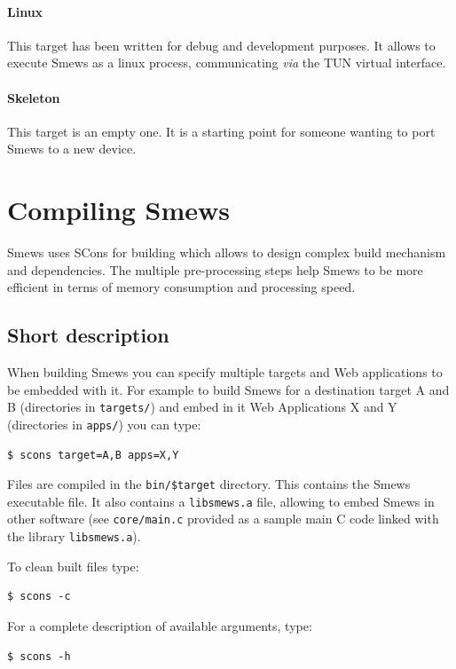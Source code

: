 \documentclass{report}
\begin{document}
\paragraph{Linux}

This target has been written for debug and development purposes. It allows to execute Smews as a linux process, communicating {\it via} the TUN virtual interface.

\paragraph{Skeleton}

This target is an empty one. It is a starting point for someone wanting to port Smews to a new device.

\section{Compiling Smews}
\label{sec:compile}

Smews uses SCons for building which allows to design complex build mechanism and dependencies. The multiple pre-processing steps help Smews to be more efficient in terms of memory consumption and processing speed.

\subsection{Short description}

When building Smews you can specify multiple targets and Web applications to be embedded with it. For example to build Smews for a destination target A and B (directories in \verb+targets/+) and embed in it Web Applications X and Y (directories in \verb+apps/+) you can type:

\begin{verbatim}
$ scons target=A,B apps=X,Y
\end{verbatim}

Files are compiled in the \verb+bin/$target+ directory. This contains the Smews executable file. It also contains a \verb+libsmews.a+ file, allowing to embed Smews in other software (see \verb+core/main.c+ provided as a sample main C code linked with the library \verb+libsmews.a+).

To clean built files type:
\begin{verbatim}
$ scons -c
\end{verbatim}

For a complete description of available arguments, type:
\begin{verbatim}
$ scons -h
\end{verbatim}
\end{document}
